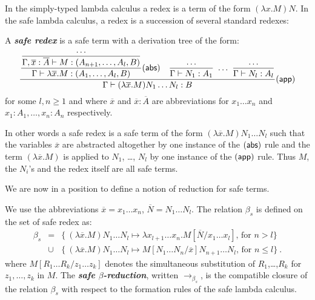 \documentclass{llncs}
\newcommand\defname[1]{{\bf\em #1}\index{#1}}
\newcommand\betasred{\rightarrow_{\beta_s}}
\newcommand\subst[2]{\left[ #1/#2 \right]}
\newcommand\rulef[2]{\frac{\dps #1}{\dps #2}}
\begin{document}
In the simply-typed lambda calculus a redex is a term of the form
$(\lambda x . M) N$. In the safe lambda calculus, a redex is a
succession of several standard redexes:
\begin{definition}\rm
A \defname{safe redex} is a safe term with a derivation tree of the form:
$$   \rulef{
            \rulef{\rulef{\ldots}{\Gamma, \overline{x}:\overline{A} \vdash M : (A_{n+1}, \ldots, A_l, B)}}{\Gamma \vdash \lambda \overline{x} . M : (A_1, \ldots, A_l, B)} ({\sf abs })
            \quad
            \rulef{\ldots}{\Gamma \vdash N_1 :A_1}  \ \ldots \  \rulef{\ldots}{\Gamma \vdash N_l :A_l}
    }
    {
       \Gamma \vdash (\lambda \overline{x} . M) N_1 \ldots N_l : B
    } ({\sf app})
$$
for some $l,n\geq 1$ and where $\overline{x}$ and 
$\overline{x}:\overline{A}$ are abbreviations for $x_1 \ldots x_n$
and $x_1:A_1, \ldots, x_n : A_n$ respectively.
\end{definition}

In other words a safe redex is a safe term of the form $(\lambda
\overline{x} . M) N_1 \ldots N_l$ such that the variables
$\overline{x}$ are abstracted altogether by one instance of the
$(\sf{abs})$ rule and the term $(\lambda \overline{x} . M)$ is
applied to $N_1$, \ldots, $N_l$ by one instance of the $(\sf{app})$ rule. Thus $M$, the $N_i$'s and the redex itself are all safe terms.


We are now in a position to define a notion of reduction for safe terms.

\begin{definition}\rm
\label{dfn:safereduction} We use the
abbreviations $\overline{x} = x_1 \ldots x_n$,
$\overline{N} = N_1 \ldots N_l$.
The relation $\beta_s$ is defined on the set of safe redex as:
\begin{eqnarray*}
  \beta_s &=&
  \{  \ (\lambda \overline{x} . M) N_1 \ldots N_l \mapsto \lambda x_{l+1} \ldots x_n. M\subst{\overline{N}}{x_1 \ldots x_l} \mbox{, for $n> l$}
  \} \\
  &\cup&
  \{ \ (\lambda \overline{x}  . M) N_1 \ldots N_l \mapsto M\subst{N_1 \ldots N_n}{\overline{x}} N_{n+1} \ldots N_l
  \mbox{, for $n\leq l$} \} \ .
\end{eqnarray*}
where $M\subst{R_1 \ldots R_k}{z_1 \ldots z_k}$ denotes the simultaneous substitution of $R_1$,\ldots,$R_k$ for $z_1, \ldots, z_k$ in $M$.  The
\defname{safe $\beta$-reduction}, written $\betasred$, is the
compatible closure of the relation $\beta_s$ with respect to the
formation rules of the safe lambda calculus.
\end{definition}
\end{document}

